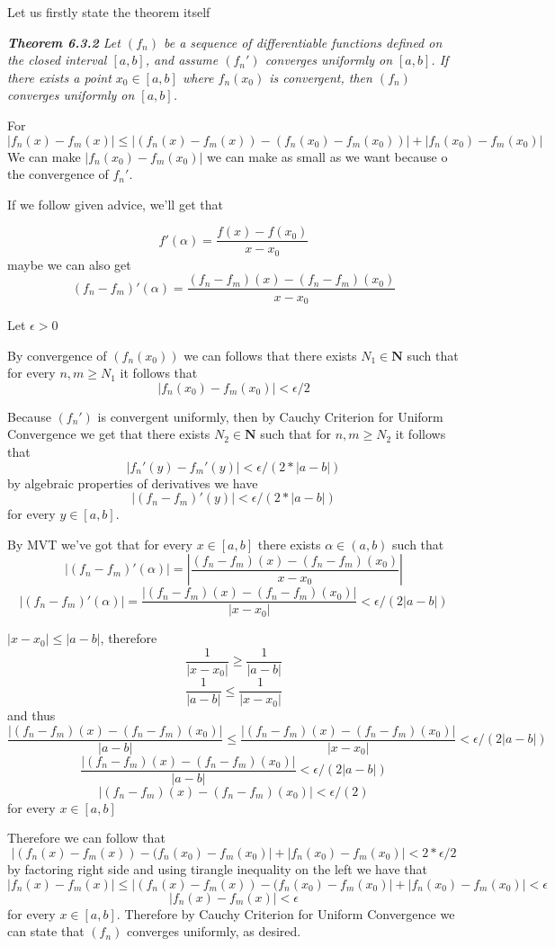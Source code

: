 \documentclass[11pt,oneside,titlepage]{book}
\begin{document}
Let us firstly state the theorem itself

\textit{\textbf{Theorem 6.3.2} Let $(f_n)$ be a sequence of differentiable
  functions defined on the closed interval $[a, b]$, and assume $(f_n')$
  converges uniformly on $[a, b]$. If there exists a point $x_0 \in [a, b]$
  where $f_n(x_0)$ is convergent, then $(f_n)$ converges uniformly on
  $[a, b]$. }

For 
$$|f_n(x) - f_m(x)| \leq |(f_n(x) - f_m(x)) - (f_n(x_0) - f_m(x_0))| +
|f_n(x_0) - f_m(x_0)|$$
We can make $|f_n(x_0) - f_m(x_0)|$ we can make as small as we want because o
the convergence of $f_n'$.

If we follow given advice, we'll get that

$$f'(\alpha) = \frac{f(x) - f(x_0)}{x - x_0}$$
maybe we can also get
$$(f_n - f_m)'(\alpha) = \frac{(f_n - f_m)(x) - (f_n - f_m)(x_0)}{x - x_0}$$

Let $\epsilon > 0$

By convergence of $(f_n(x_0))$ we can follows that there exists
$N_1 \in \textbf{N}$ such that for every $n, m \geq N_1$ it follows that
$$|f_n(x_0) - f_m(x_0)| < \epsilon/2$$

Because $(f_n')$ is convergent uniformly, then by Cauchy Criterion for
Uniform Convergence we get that there exists $N_2 \in \textbf{N}$ such that
for $n, m \geq N_2$ it follows that
$$|f_n'(y) - f_m'(y)| < \epsilon/(2 * |a - b|)$$
by algebraic properties of derivatives we have
$$|(f_n - f_m)'(y)| < \epsilon/(2 * |a - b|)$$
for every $y \in [a, b]$.

By MVT we've got that for every $x \in [a, b]$ there exists $\alpha \in (a, b)$
such that
$$|(f_n - f_m)'(\alpha)| = \left|\frac{(f_n - f_m)(x) -
    (f_n - f_m)(x_0)}{x - x_0}\right|$$
$$|(f_n - f_m)'(\alpha)| = \frac{|(f_n - f_m)(x) -
  (f_n - f_m)(x_0)|}{|x - x_0|} < \epsilon/(2|a - b|)$$

$|x - x_0| \leq |a - b|$, therefore
$$\frac{1}{|x - x_0|} \geq \frac{1}{|a - b|}$$
$$ \frac{1}{|a - b|} \leq \frac{1}{|x - x_0|} $$
and thus
$$\frac{|(f_n - f_m)(x) -
  (f_n - f_m)(x_0)|}{|a - b|} \leq
\frac{|(f_n - f_m)(x) -
  (f_n - f_m)(x_0)|}{|x - x_0|} < \epsilon/(2|a - b|)$$
$$\frac{|(f_n - f_m)(x) -
  (f_n - f_m)(x_0)|}{|a - b|} < \epsilon/(2|a - b|)$$
$$|(f_n - f_m)(x) -
(f_n - f_m)(x_0)| < \epsilon/(2)$$
for every $x \in [a, b]$

Therefore we can follow that 
$$ |(f_n(x) - f_m(x)) - (f_n(x_0) - f_m(x_0)| +
|f_n(x_0) - f_m(x_0)| < 2 * \epsilon/2$$
by factoring right side and using tirangle inequality on the left we have that
$$ |f_n(x) - f_m(x) |\leq |(f_n(x) - f_m(x)) - (f_n(x_0) - f_m(x_0)| +
|f_n(x_0) - f_m(x_0)| <  \epsilon$$
$$ |f_n(x) - f_m(x) |<  \epsilon$$
for every $x \in [a, b]$. Therefore by Cauchy Criterion for Uniform Convergence
we can state that $(f_n)$ converges uniformly, as desired.
\end{document}
